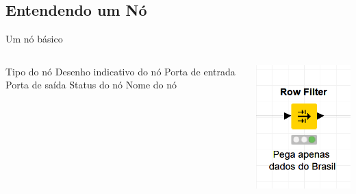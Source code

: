 \documentclass{beamer}
\begin{document}
\subsection{Entendendo um Nó}
\begin{frame}{Um nó básico}
    \begin{columns}
        \begin{column}{0.5\linewidth}
        \begin{outline}
            \1 Tipo do nó
            \1 Desenho indicativo do nó
            \1 Porta de entrada
            \1 Porta de saída
            \1 Status do nó
            \1 Nome do nó
        \end{outline}
        \end{column}
        \begin{column}{0.5\linewidth}
        \includegraphics[width=0.8\linewidth]{Images/UmNo.png}
        \end{column}
    \end{columns}
\end{frame} 
\end{document}
